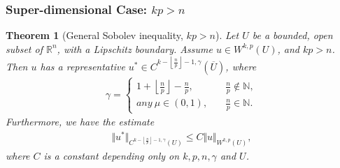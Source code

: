 \documentclass{article}
\numberwithin{equation}{section}
\newcommand{\bbN}{\mathbb{N}}
\newcommand{\bbR}{\mathbb{R}}
\newcommand{\ol}{\overline}
\theoremstyle{plain}
\newtheorem{theorem}{Theorem}[section]
\theoremstyle{definition}
\begin{document}
\subsubsection{Super-dimensional Case: $kp>n$}
\begin{theorem}[General Sobolev inequality, $kp>n$]\label{thm:4.12}
Let $U$ be a bounded, open subset of $\bbR^n$, with a Lipschitz boundary. Assume $u\in W^{k,p}(U)$, and $kp>n$. Then $u$ has a representative $u^*\in C^{k-\left\lfloor\frac{n}{p}\right\rfloor-1,\gamma}(\ol{U})$, where
\begin{align*}
	\gamma=\begin{cases}
		1+\left\lfloor\frac{n}{p}\right\rfloor-\frac{n}{p},\quad
		&\frac{n}{p}\notin\bbN,\\
		any\ \mu\in(0,1),\quad &\frac{n}{p}\in\bbN.
	\end{cases}
	\end{align*}
	Furthermore, we have the estimate
	\begin{align*}
		\Vert u^*\Vert_{C^{k-\left\lfloor\frac{n}{p}\right\rfloor-1,\gamma}(U)}\leq C\Vert u\Vert_{W^{k,p}(U)},
	\end{align*}
	where $C$ is a constant depending only on $k,p,n,\gamma$ and $U$.
\end{theorem}
\end{document}
